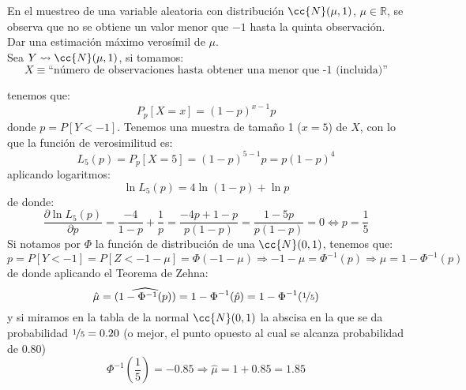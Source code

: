 \begin{ejercicio}
    En el muestreo de una variable aleatoria con distribución $\cc{N}(\mu,1)$, $\mu \in \mathbb{R}$, se observa que no se obtiene un valor menor que $-1$ hasta la quinta observación. Dar una estimación máximo verosímil de $\mu$.\\

    \noindent
    Sea $Y\rightsquigarrow\cc{N}(\mu, 1)$, si tomamos:
    \begin{equation*}
        X\equiv \text{``número de observaciones hasta obtener una menor que -1 (incluida)''}
    \end{equation*}

    tenemos que:
    \begin{equation*}
        P_p[X=x] = {(1-p)}^{x-1}p
    \end{equation*}
    donde $p= P[Y<-1]$. Tenemos una muestra de tamaño 1 ($x=5$) de $X$, con lo que la función de verosimilitud es:
    \begin{equation*}
        L_5(p) = P_p[X=5] = {(1-p)}^{5-1}p = p{(1-p)}^{4}
    \end{equation*}
    aplicando logaritmos:
    \begin{equation*}
        \ln L_5(p) = 4\ln(1-p) + \ln p
    \end{equation*}
    de donde:
    \begin{equation*}
        \dfrac{\partial \ln L_5(p)}{\partial p} = \frac{-4}{1-p}+\frac{1}{p} = \frac{-4p+1-p}{p(1-p)} = \frac{1-5p}{p(1-p)} = 0 \Longleftrightarrow p = \frac{1}{5}
    \end{equation*}
    Si notamos por $\Phi$ la función de distribución de una $\cc{N}(0,1)$, tenemos que:
    \begin{equation*}
        p = P[Y< -1] = P[Z<-1-\mu] = \Phi(-1-\mu) \Longrightarrow -1-\mu = \Phi^{-1}(p) \Longrightarrow \mu = 1-\Phi^{-1}(p)
    \end{equation*}
    de donde aplicando el Teorema de Zehna:
    \begin{equation*}
        \hat{\mu} = \widehat{(1-\Phi^{-1}(p))} = 1-\Phi^{-1}(\hat{p}) = 1-\Phi^{-1}(\nicefrac{1}{5})
    \end{equation*}
    y si miramos en la tabla de la normal $\cc{N}(0,1)$ la abscisa en la que se da probabilidad $\nicefrac{1}{5} = 0.20$ (o mejor, el punto opuesto al cual se alcanza probabilidad de $0.80$)
    \begin{equation*} %
        \Phi^{-1}\left(\frac{1}{5}\right) = -0.85 \Longrightarrow \hat{\mu} = 1+0.85 = 1.85
    \end{equation*}
\end{ejercicio}

